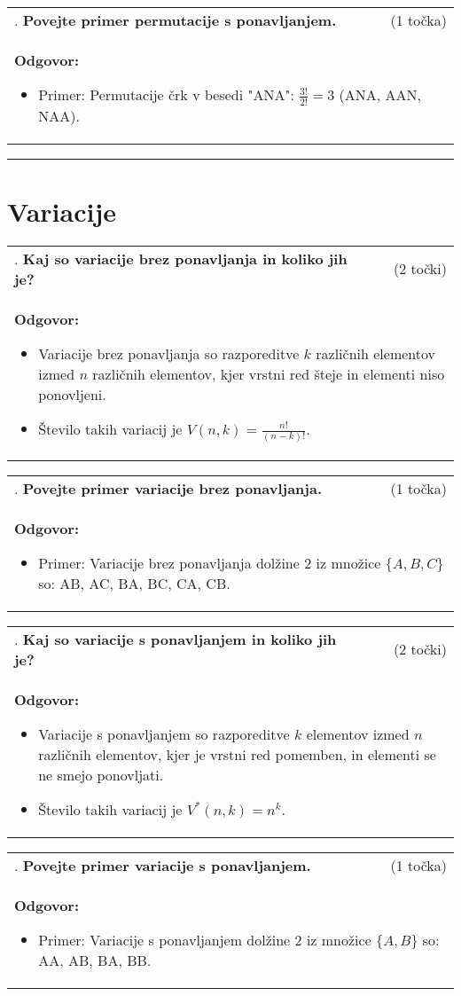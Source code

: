 \documentclass[12pt]{article}
\newcounter{vprasanje}[section]
\renewcommand{\thevprasanje}{\roman{vprasanje}}
\newcommand{\vprasanje}[2]{%
  \stepcounter{vprasanje}%
  \textbf{\thevprasanje}. \textbf{#1} & (#2) \\
}
\newcommand{\odgovor}[1]{%
  \multicolumn{2}{p{\dimexpr\textwidth-2\tabcolsep\relax}}{%
    \small \textbf{Odgovor:} #1%
  } \\[1em]%
}
\newcommand{\crta}{\rule{\textwidth}{0.4pt}}
\newcommand{\naslov}[1]{%
  \vspace{1em} 
  \section{#1}
  \addcontentsline{toc}{section}{\protect\numberline{}#1}%
}
\newcommand{\razmak}[1]{%
  \vspace{#1}
}
\begin{document}
\begin{tabularx}{\textwidth}{X r}
\vprasanje{Povejte primer permutacije s ponavljanjem.}{1 točka}
\odgovor{
\begin{itemize}
  \item Primer: Permutacije črk v besedi "ANA": $\frac{3!}{2!} = 3$ (ANA, AAN, NAA).
\end{itemize}
}
\end{tabularx}
\razmak{0.5em}


\crta

\naslov{Variacije}

\begin{tabularx}{\textwidth}{X r}
\vprasanje{Kaj so variacije brez ponavljanja in koliko jih je?}{2 točki}
\odgovor{
\begin{itemize}
  \item Variacije brez ponavljanja so razporeditve $k$ različnih elementov izmed $n$ različnih elementov, kjer vrstni red šteje in elementi niso ponovljeni.
  \item Število takih variacij je $V(n, k) = \frac{n!}{(n - k)!}$.
\end{itemize}
}
\end{tabularx}

\begin{tabularx}{\textwidth}{X r}
\vprasanje{Povejte primer variacije brez ponavljanja.}{1 točka}
\odgovor{
\begin{itemize}
  \item Primer: Variacije brez ponavljanja dolžine $2$ iz množice $\{A, B, C\}$ so: AB, AC, BA, BC, CA, CB.
\end{itemize}
}
\end{tabularx}

\begin{tabularx}{\textwidth}{X r}
\vprasanje{Kaj so variacije s ponavljanjem in koliko jih je?}{2 točki}
\odgovor{
\begin{itemize}
  \item Variacije s ponavljanjem so razporeditve $k$ elementov izmed $n$ različnih elementov, kjer je vrstni red pomemben, in elementi se ne smejo ponovljati.
  \item Število takih variacij je $V^*(n, k) = n^k$.
\end{itemize}
}
\end{tabularx}

\begin{tabularx}{\textwidth}{X r}
\vprasanje{Povejte primer variacije s ponavljanjem.}{1 točka}
\odgovor{
\begin{itemize}
  \item Primer: Variacije s ponavljanjem dolžine $2$ iz množice $\{A, B\}$ so: AA, AB, BA, BB.
\end{itemize}
}
\end{tabularx}
\end{document}
